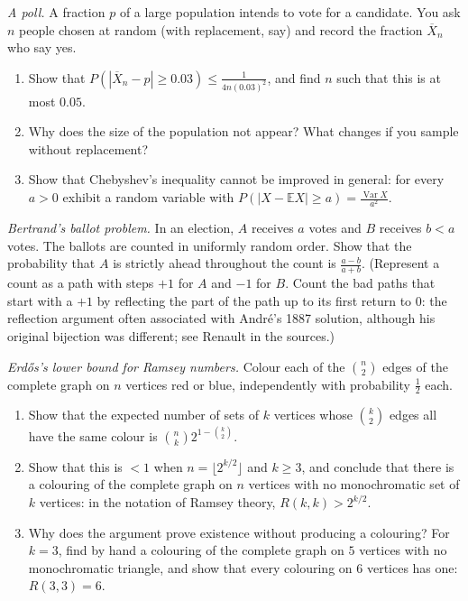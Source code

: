 \begin{exercise}[$\star\star$]\label{ex:poll}
\emph{A poll.} A fraction $p$ of a large population intends to vote for a candidate. You ask $n$ people chosen at random (with replacement, say) and record the fraction $\overline X_n$ who say yes.
\begin{enumerate}[label=(\alph*)]
\item Show that $P(|\overline X_n-p|\ge0.03)\le\frac1{4n(0.03)^2}$, and find $n$ such that this is at most $0.05$.
\item Why does the size of the population not appear? What changes if you sample without replacement?
\item Show that Chebyshev's inequality cannot be improved in general: for every $a>0$ exhibit a random variable with $P(|X-\mathbb EX|\ge a)=\frac{\operatorname{Var}X}{a^2}$.
\end{enumerate}
\end{exercise}

\begin{exercise}[$\star\star\star$]\label{ex:ballot}
\emph{Bertrand's ballot problem.} In an election, $A$ receives $a$ votes and $B$ receives $b<a$ votes. The ballots are counted in uniformly random order. Show that the probability that $A$ is strictly ahead throughout the count is $\frac{a-b}{a+b}$. (Represent a count as a path with steps $+1$ for $A$ and $-1$ for $B$. Count the bad paths that start with a $+1$ by reflecting the part of the path up to its first return to $0$: the reflection argument often associated with Andr\'e's 1887 solution, although his original bijection was different; see Renault in the sources.)
\end{exercise}

\begin{exercise}[$\star\star\star$]\label{ex:ramsey}
\emph{Erd\H os's lower bound for Ramsey numbers.} Colour each of the $\binom n2$ edges of the complete graph on $n$ vertices red or blue, independently with probability $\frac12$ each.
\begin{enumerate}[label=(\alph*)]
\item Show that the expected number of sets of $k$ vertices whose $\binom k2$ edges all have the same colour is $\binom nk2^{1-\binom k2}$.
\item Show that this is $<1$ when $n=\lfloor2^{k/2}\rfloor$ and $k\ge3$, and conclude that there is a colouring of the complete graph on $n$ vertices with no monochromatic set of $k$ vertices: in the notation of Ramsey theory, $R(k,k)>2^{k/2}$.
\item Why does the argument prove existence without producing a colouring? For $k=3$, find by hand a colouring of the complete graph on $5$ vertices with no monochromatic triangle, and show that every colouring on $6$ vertices has one: $R(3,3)=6$.
\end{enumerate}
\end{exercise}

